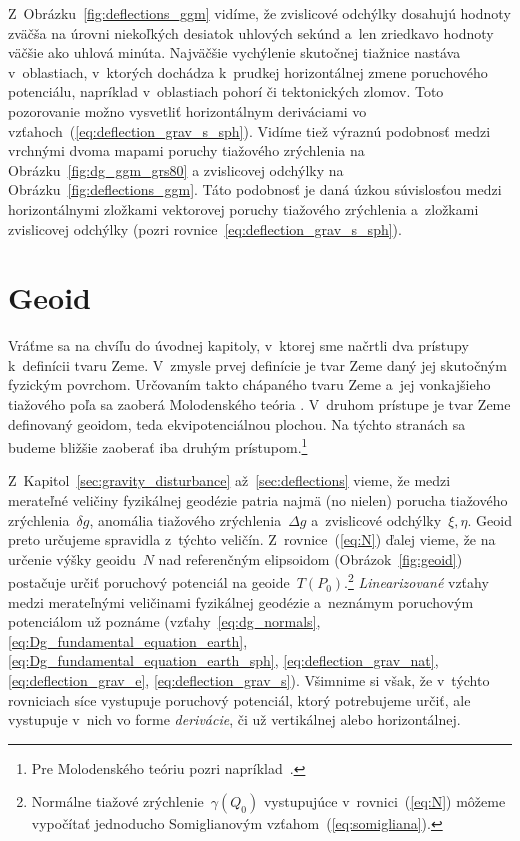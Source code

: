 \documentclass[a4paper, 12pt]{book}
\begin{document}
Z~Obrázku~\ref{fig:deflections_ggm} vidíme, že zvislicové odchýlky dosahujú 
hodnoty zväčša na úrovni niekoľkých desiatok uhlových sekúnd a~len zriedkavo 
hodnoty väčšie ako uhlová minúta.  Najväčšie vychýlenie skutočnej tiažnice 
nastáva v~oblastiach, v~ktorých dochádza k~prudkej horizontálnej zmene 
poruchového potenciálu, napríklad v~oblastiach pohorí či tektonických zlomov.  
Toto pozorovanie možno vysvetliť horizontálnym deriváciami vo 
vzťahoch~(\ref{eq:deflection_grav_s_sph}).  Vidíme tiež výraznú podobnosť medzi 
vrchnými dvoma mapami poruchy tiažového zrýchlenia na 
Obrázku~\ref{fig:dg_ggm_grs80} a zvislicovej odchýlky na 
Obrázku~\ref{fig:deflections_ggm}.  Táto podobnosť je daná úzkou súvislosťou 
medzi horizontálnymi zložkami vektorovej poruchy tiažového zrýchlenia 
a~zložkami zvislicovej odchýlky (pozri rovnice~\ref{eq:deflection_grav_s_sph}).







\chapter{Geoid}
\label{sec:geoid}

Vráťme sa na chvíľu do úvodnej kapitoly, v~ktorej sme načrtli dva prístupy 
k~definícii tvaru Zeme.  V~zmysle prvej definície je tvar Zeme daný jej 
skutočným fyzickým povrchom.  Určovaním takto chápaného tvaru Zeme a~jej 
vonkajšieho tiažového poľa sa zaoberá Molodenského teória 
\parencite{Molodensky1962,Borre_chapter8,MoritzAdvancedGeodesy,MoritzPhysicalGeodesy}.  
V~druhom prístupe je tvar Zeme definovaný geoidom, teda ekvipotenciálnou 
plochou.  Na týchto stranách sa budeme bližšie zaoberať iba druhým 
prístupom.\footnote{Pre Molodenského teóriu pozri 
napríklad~\textcite{Janak2006}.}

Z~Kapitol~\ref{sec:gravity_disturbance} až~\ref{sec:deflections} vieme, že 
medzi merateľné veličiny fyzikálnej geodézie patria najmä (no nielen) porucha 
tiažového zrýchlenia~$\delta g$, anomália tiažového zrýchlenia~$\Delta g$ 
a~zvislicové odchýlky~$\xi, \eta$.  Geoid preto určujeme spravidla z~týchto 
veličín.  Z~rovnice~(\ref{eq:N}) ďalej vieme, že na určenie výšky geoidu~$N$ 
nad referenčným elipsoidom (Obrázok~\ref{fig:geoid}) postačuje určiť poruchový 
potenciál na geoide~$T(P_0)$.\footnote{Normálne tiažové 
zrýchlenie~$\gamma(Q_0)$ vystupujúce v~rovnici~(\ref{eq:N}) môžeme vypočítať 
jednoducho Somiglianovým vzťahom~(\ref{eq:somigliana}).}  \emph{Linearizované} 
vzťahy medzi merateľnými veličinami fyzikálnej geodézie a~neznámym poruchovým 
potenciálom už poznáme (vzťahy~\ref{eq:dg_normals}, 
\ref{eq:Dg_fundamental_equation_earth}, 
\ref{eq:Dg_fundamental_equation_earth_sph}, \ref{eq:deflection_grav_nat}, 
\ref{eq:deflection_grav_e}, \ref{eq:deflection_grav_s}).  Všimnime si však, že 
v~týchto rovniciach síce vystupuje poruchový potenciál, ktorý potrebujeme 
určiť, ale vystupuje v~nich vo forme \emph{derivácie}, či už vertikálnej alebo 
horizontálnej.
\end{document}
